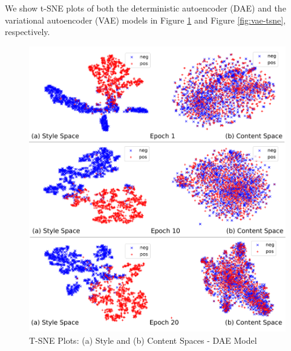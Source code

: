 \documentclass[11pt,a4paper]{article}
\begin{document}
\begin{table}[!t]
	\centering
	\caption{Style classification accuracy.}
	\label{tab:classification}
\end{table}

We show t-SNE plots of both the deterministic autoencoder (DAE) and the variational autoencoder (VAE) models in Figure \ref{fig:dae-tsne} and Figure \ref{fig:vae-tsne}, respectively.

\begin{figure}[ht]
	\includegraphics[width=\linewidth]{latent-spaces-dae}
	\caption{T-SNE Plots: (a) Style and (b) Content Spaces - DAE Model}
	\label{fig:dae-tsne}
\end{figure}
\end{document}
